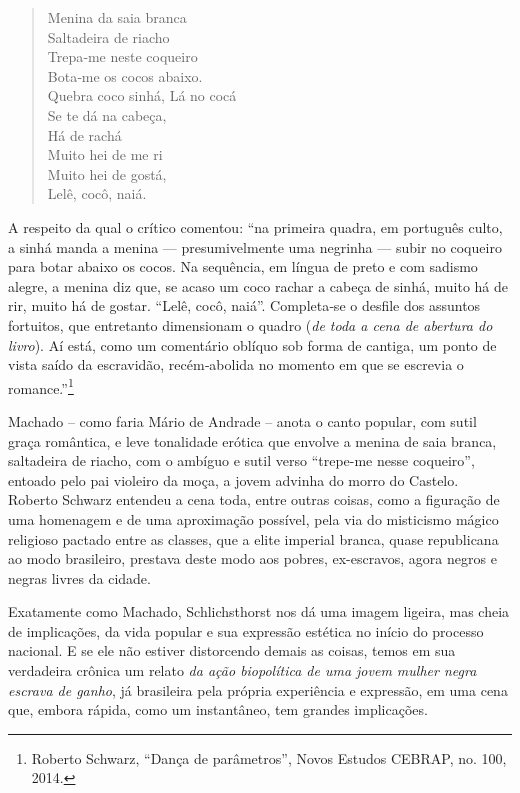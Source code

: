 \begin{verse}
Menina da saia branca\\
Saltadeira de riacho\\
Trepa‑me neste coqueiro\\
Bota‑me os cocos abaixo.\\[5pt]
Quebra coco sinhá, Lá no cocá\\
Se te dá na cabeça,\\
Há de rachá\\[5pt]
Muito hei de me ri\\
Muito hei de gostá,\\
Lelê, cocô, naiá.
\end{verse}

A respeito da qual o crítico comentou: ``na primeira quadra, em
português culto, a sinhá manda a menina --- presumivelmente uma negrinha
--- subir no coqueiro para botar abaixo os cocos. Na sequência, em
língua de preto e com sadismo alegre, a menina diz que, se acaso um coco
rachar a cabeça de sinhá, muito há de rir, muito há de gostar. ``Lelê,
cocô, naiá''. Completa‑se o desfile dos assuntos fortuitos, que
entretanto dimensionam o quadro (\emph{de toda a cena de abertura do
livro}). Aí está, como um comentário oblíquo sob forma de cantiga, um
ponto de vista saído da escravidão, recém‑abolida no momento em que se
escrevia o romance.''\footnote{Roberto Schwarz, ``Dança de parâmetros'',
  Novos Estudos CEBRAP, no. 100, 2014.}

Machado -- como faria Mário de Andrade -- anota o canto popular, com
sutil graça romântica, e leve tonalidade erótica que envolve a menina de
saia branca, saltadeira de riacho, com o ambíguo e sutil verso
``trepe-me nesse coqueiro'', entoado pelo pai violeiro da moça, a jovem
advinha do morro do Castelo. Roberto Schwarz entendeu a cena toda, entre
outras coisas, como a figuração de uma homenagem e de uma aproximação
possível, pela via do misticismo mágico religioso pactado entre as
classes, que a elite imperial branca, quase republicana ao modo
brasileiro, prestava deste modo aos pobres, ex-escravos, agora negros e
negras livres da cidade.

Exatamente como Machado, Schlichsthorst nos dá uma imagem ligeira, mas
cheia de implicações, da vida popular e sua expressão estética no início
do processo nacional. E se ele não estiver distorcendo demais as coisas,
temos em sua verdadeira crônica um relato \emph{da ação biopolítica de
uma jovem mulher negra escrava de ganho}, já brasileira pela própria
experiência e expressão, em uma cena que, embora rápida, como um
instantâneo, tem grandes implicações.

